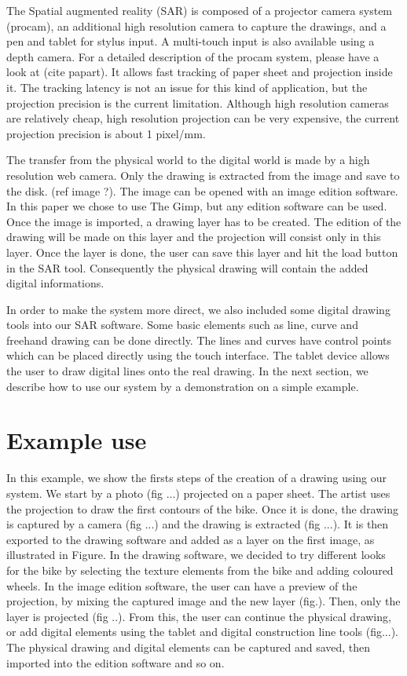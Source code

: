 \documentclass{article}
\begin{document}
The Spatial augmented reality (SAR) is composed of a projector camera system (procam), an additional high resolution camera to capture the drawings, and a pen and tablet for stylus input. A multi-touch input is also available using a depth camera. For a detailed description of the procam system, please have a look at (cite papart). It allows fast tracking of paper sheet and projection inside it. The tracking latency is not an issue for this kind of application, but the projection precision is the current limitation. Although high resolution cameras are relatively cheap, high resolution projection can be very expensive, the current projection precision is about 1 pixel/mm. 

The transfer from the physical world to the digital world is made by a high resolution web camera. Only the drawing is extracted from the image and save to the disk. (ref image ?). The image can be opened with an image edition software. In this paper we chose to use The Gimp, but any edition software can be used. Once the image is imported, a drawing layer has to be created. The edition of the drawing will be made on this layer and the projection will consist only in this layer. Once the  layer is done, the user can save this layer and hit the load button in the SAR tool. Consequently the physical drawing will contain the added digital informations.  

In order to make the system more direct, we also included some digital drawing tools into our SAR software. Some basic elements such as line, curve and freehand drawing can be done directly. The lines and curves have control points which can be placed directly using the touch interface. The tablet device allows the user to draw digital lines onto the real drawing. In the next section, we describe how to use our system by a demonstration on a simple example. 


\section{Example use}

In this example, we show the firsts steps of the creation of a drawing using our system. We start by a photo (fig ...) projected on a paper sheet. The artist uses the projection to draw the first contours of the bike. Once it is done, the drawing is captured by a camera (fig ...) and the drawing is extracted (fig ...). It is then exported to the drawing software and added as a layer on the first image, as illustrated in Figure. 
In the drawing software, we decided to try different looks for the bike by selecting the texture elements from the bike and adding coloured wheels. In the image edition software, the user can have a preview of the projection, by mixing the captured image and the new layer (fig.). Then, only the layer is projected  (fig ..). From this, the user can continue the physical drawing, or add digital elements using the tablet and digital construction line tools (fig...). The physical drawing and digital elements can be captured and saved, then imported into the edition software and so on. 
\end{document}
